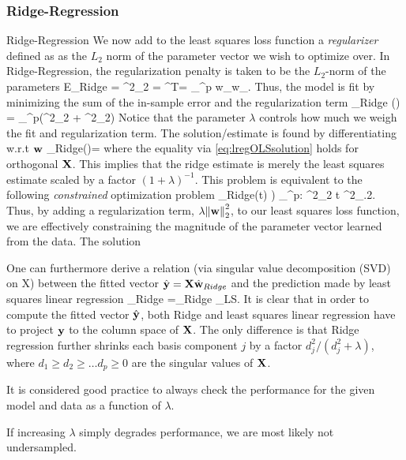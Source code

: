 \subsubsection{Ridge-Regression}
\begin{mybox}{Ridge-Regression}
	We now add to the least squares loss function a \emph{regularizer} defined as as the $L_2$ norm of the parameter vector we wish to optimize over. In Ridge-Regression, the regularization penalty is taken to be the $L_2$-norm of the parameters 
	\be 
	E_{Ridge} = \lambda \norm{\mw}^2_2 = \lambda \mw^T\mw = \lambda \sum_{}^p w_\gamma w_\gamma.
	\ee 
	Thus, the model is fit by minimizing the sum of the in-sample error and the regularization term
	\be 
	\label{eq:lregRidge}
	\hat{\mw}_{Ridge} (\lambda) = \arg \min_{\mw \in \mR^p}\left(\norm{\mX \mw - \my}^2_2 + \lambda \norm{\mw}^2_2\right)
	\ee 
	Notice that the parameter $\lambda$ controls how much we weigh the fit and regularization term.
	The solution/estimate is found by differentiating w.r.t $\mathbf{w}$
	\be 
	\label{eq:lregRidgeSol}
	\hat{\mw}_{Ridge}(\lambda)= 
	\ee 
	where the  equality via \ref{eq:lregOLSsolution} holds for orthogonal $\mathbf{X}$. This implies that the ridge estimate is merely the least squares estimate scaled by a factor $(1+\lambda)^{-1}$.
	This problem is equivalent to the following \emph{constrained} optimization problem
	\be 
	\hat{\mw}_{Ridge}(t) ) \arg \min_{\mw \in \mR^p: \norm{\mw}^2_2 \leq t} \norm{\mX \mw -\my}^2_.2.
	\ee 
	Thus, by adding a regularization term, $\lambda \norm{\mathbf{w}}^2_2$, to our least squares loss function, we are effectively constraining the magnitude of the parameter vector learned from the data. The solution
\end{mybox}
One can furthermore derive a relation (via singular value decomposition (SVD) on X) between the fitted vector $\hat{\mathbf{y}}=\mathbf{X}\hat{\mathbf{w}}_{Ridge}$ and the prediction made by least squares linear regression
\be 
{}_{Ridge} =\mX \hat{\mw}_{Ridge} \leq \mX \hat{\my} \equiv \hat{\my}_{LS}.
\ee 
It is clear that in order to compute the fitted vector $\hat{\mathbf{y}}$, both Ridge and least squares linear regression have to project $\mathbf{y}$ to the column space of $\mathbf{X}$. The only difference is that Ridge regression further shrinks each basis component $j$ by a factor $d^2_j/(d^2_j+\lambda)$, where $d_1\geq d_2\geq \dots d_p \geq 0$ are the singular values of $\mathbf{X}$.
\begin{mybox}{}
	It is considered good practice to always check the performance for the given model and data as a function of $\lambda$.
\end{mybox}
If increasing $\lambda$  simply degrades performance, we are most likely not undersampled.
